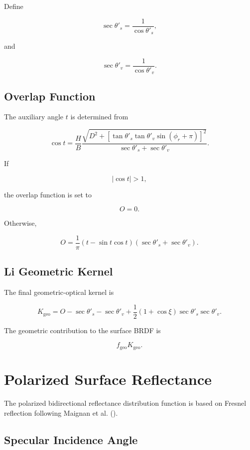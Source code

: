 \documentclass[
  11pt,
  letterpaper,
]{scrreprt}
\begin{document}
Define

\[
\sec\theta'_s
=
\frac{1}{\cos\theta'_s},
\]

and

\[
\sec\theta'_v
=
\frac{1}{\cos\theta'_v}.
\]

\subsection{Overlap Function}\label{overlap-function}

The auxiliary angle \(t\) is determined from

\[
\cos t
=
\frac{H}{B}
\frac{
\sqrt{
D^2
+
\left[
\tan\theta'_s
\tan\theta'_v
\sin(\phi_r+\pi)
\right]^2
}
}{
\sec\theta'_s+\sec\theta'_v
}.
\]

If

\[
|\cos t|>1,
\]

the overlap function is set to

\[
O=0.
\]

Otherwise,

\[
O
=
\frac{1}{\pi}
(t-\sin t\cos t)
(\sec\theta'_s+\sec\theta'_v).
\]

\subsection{Li Geometric Kernel}\label{li-geometric-kernel}

The final geometric-optical kernel is

\[
K_{\mathrm{geo}}
=
O
-
\sec\theta'_s
-
\sec\theta'_v
+
\frac{1}{2}
(1+\cos\xi)
\sec\theta'_s
\sec\theta'_v.
\]

The geometric contribution to the surface BRDF is

\[
f_{\mathrm{geo}}K_{\mathrm{geo}}.
\]

\section{Polarized Surface
Reflectance}\label{polarized-surface-reflectance-1}

The polarized bidirectional reflectance distribution function is based
on Fresnel reflection following Maignan et al.
().

\subsection{Specular Incidence Angle}\label{specular-incidence-angle}
\end{document}

